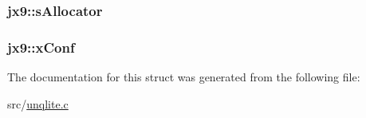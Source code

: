 \hypertarget{structjx9_ac3ebe84eca3af6d35bf799c9b5ca8a5c}{
\subsubsection[{s\-Allocator}]{ jx9\-::s\-Allocator}}\label{d4/da4/structjx9_ac3ebe84eca3af6d35bf799c9b5ca8a5c}
\hypertarget{structjx9_afbb12e02cc36044030154df3d0dee5f3}{
\subsubsection[{x\-Conf}]{ jx9\-::x\-Conf}}\label{d4/da4/structjx9_afbb12e02cc36044030154df3d0dee5f3}


The documentation for this struct was generated from the following file\-:\begin{DoxyCompactItemize}
\item 
src/\hyperlink{unqlite_8c}{unqlite.\-c}\end{DoxyCompactItemize}
